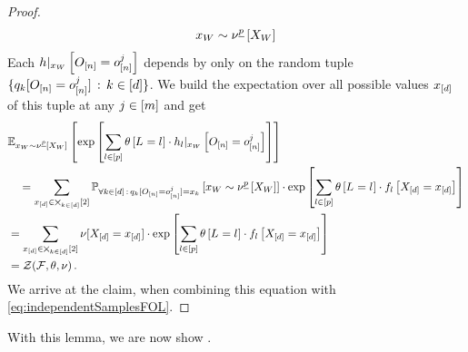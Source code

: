 \begin{proof}
\begin{align}
{        }{x_{W}\sim\nu^{\underline{p}}\left[X_{W}\right]}
    \end{align}
    Each ${h}|_{x_{W}} \left[O_{[n]}=o_{[n]}^{j}\right]$ depends by  only on the random tuple $\{q_{k}[O_{[n]}=o_{[n]}^{j}] \, : \, k\in[d]\}$.
    We build the expectation over all possible values $x_{[d]}$ of this tuple at any $j\in[m]$ and get
    \begin{align*}
        & \mathbb{E}_{x_{W}\sim\nu^{\underline{p}}\left[X_{W}\right]}\left[
            \mathrm{exp}\left[\sum_{l\in[p]} \theta\left[L_{}=l_{}\right] \cdot {h_{l}}|_{x_{W}} \left[O_{[n]}=o_{[n]}^{j}\right]\right]
        \right] \\
        & \quad = \sum_{x_{[d]}\in\bigtimes_{k\in[d]}[2]}
        \mathbb{P}_{\forall{k\in[d]} \, : \, q_{k}[O_{[n]}=o_{[n]}^{j}] =x_{k}}\left[x_{W}\sim\nu^{\underline{p}}\left[X_{W}\right]\right]
        \cdot \mathrm{exp}\left[\sum_{l\in[p]}\theta\left[L_{}=l_{}\right]\cdot f_{l}\left[X_{[d]}=x_{[d]}\right]\right] \\
        & = \sum_{x_{[d]}\in\bigtimes_{k\in[d]}[2]} \nu[X_{[d]}=x_{[d]}] \cdot
        \mathrm{exp}\left[\sum_{l\in[p]} \theta\left[L_{}=l_{}\right] \cdot f_{l}\left[X_{[d]}=x_{[d]}\right]\right]
        \\
        & = \mathcal{Z}{\left(\mathcal{F},\theta,\nu\right)} \, .
    \end{align*}
    We arrive at the claim, when combining this equation with \eqref{eq:independentSamplesFOL}.
\end{proof}

With this lemma, we are now show .

